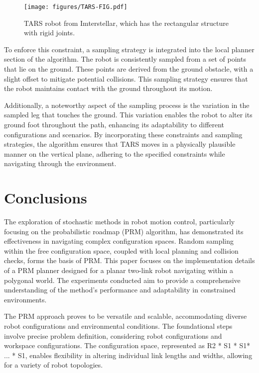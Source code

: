 \documentclass{IEEEtaes}
\begin{document}
\begin{figure}[t]
    \begin{center}
        \texttt{[image: figures/TARS-FIG.pdf]}
     \end{center}
     \vspace{-1em}
     \caption{TARS robot from Imterstellar, which has the rectangular structure with rigid joints.}
     \label{tars-fig}
     \vspace{-1em}
\end{figure}

To enforce this constraint, a sampling strategy is integrated into the local planner section of the algorithm. The robot is consistently sampled from a set of points that lie on the ground. These points are derived from the ground obstacle, with a slight offset to mitigate potential collisions. This sampling strategy ensures that the robot maintains contact with the ground throughout its motion.

Additionally, a noteworthy aspect of the sampling process is the variation in the sampled leg that touches the ground. This variation enables the robot to alter its ground foot throughout the path, enhancing its adaptability to different configurations and scenarios. By incorporating these constraints and sampling strategies, the algorithm ensures that TARS moves in a physically plausible manner on the vertical plane, adhering to the specified constraints while navigating through the environment.


\section{\large \textbf{Conclusions}}
The exploration of stochastic methods in robot motion control, particularly focusing on the probabilistic roadmap (PRM) algorithm, has demonstrated its effectiveness in navigating complex configuration spaces. Random sampling within the free configuration space, coupled with local planning and collision checks, forms the basis of PRM. This paper focuses on the implementation details of a PRM planner designed for a planar two-link robot navigating within a polygonal world. The experiments conducted aim to provide a comprehensive understanding of the method's performance and adaptability in constrained environments.

The PRM approach proves to be versatile and scalable, accommodating diverse robot configurations and environmental conditions. The foundational steps involve precise problem definition, considering robot configurations and workspace configurations. The configuration space, represented as R2 * S1 * S1* ... * S1, enables flexibility in altering individual link lengths and widths, allowing for a variety of robot topologies.
\end{document}
